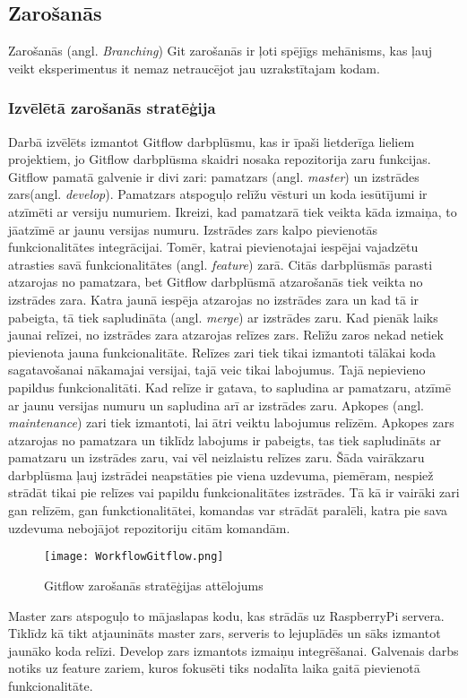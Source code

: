 \subsection{Zarošanās}
Zarošanās (angl. \textit{Branching})
Git zarošanās ir ļoti spējīgs mehānisms, kas ļauj veikt eksperimentus it nemaz netraucējot jau uzrakstītajam kodam.
\subsubsection{Izvēlētā zarošanās stratēģija}
Darbā izvēlēts izmantot Gitflow darbplūsmu, kas ir īpaši lietderīga lieliem projektiem, jo Gitflow darbplūsma skaidri nosaka repozitorija zaru funkcijas. Gitflow pamatā galvenie ir divi zari: pamatzars (angl. \textit{master}) un izstrādes zars(angl. \textit{develop}). Pamatzars atspoguļo relīžu vēsturi un koda iesūtījumi ir atzīmēti ar versiju numuriem. Ikreizi, kad pamatzarā tiek veikta kāda izmaiņa, to jāatzīmē ar jaunu versijas numuru. Izstrādes zars kalpo pievienotās funkcionalitātes integrācijai. Tomēr, katrai pievienotajai iespējai vajadzētu atrasties savā funkcionalitātes (angl. \textit{feature}) zarā. Citās darbplūsmās parasti atzarojas no pamatzara, bet Gitflow darbplūsmā atzarošanās tiek veikta no izstrādes zara. Katra jaunā iespēja atzarojas no izstrādes zara un kad tā ir pabeigta, tā tiek sapludināta (angl. \textit{merge}) ar izstrādes zaru.
Kad pienāk laiks jaunai relīzei, no izstrādes zara atzarojas relīzes zars. Relīžu zaros nekad netiek pievienota jauna funkcionalitāte. Relīzes zari tiek tikai izmantoti tālākai koda sagatavošanai nākamajai versijai, tajā veic tikai labojumus. Tajā nepievieno papildus funkcionalitāti. Kad relīze ir gatava, to sapludina ar pamatzaru, atzīmē ar jaunu versijas numuru un sapludina arī ar izstrādes zaru.
Apkopes (angl. \textit{maintenance}) zari tiek izmantoti, lai ātri veiktu labojumus relīzēm. Apkopes zars atzarojas no pamatzara un tiklīdz labojums ir pabeigts, tas tiek sapludināts ar pamatzaru un izstrādes zaru, vai vēl neizlaistu relīzes zaru.
Šāda vairākzaru darbplūsma ļauj izstrādei neapstāties pie viena uzdevuma, piemēram, nespiež strādāt tikai pie relīzes vai papildu funkcionalitātes izstrādes. Tā kā ir vairāki zari gan relīzēm, gan funkctionalitātei, komandas var strādāt paralēli, katra pie sava uzdevuma nebojājot repozitoriju citām komandām.
\begin{figure}[H]%
	\centering
	\captionsetup{justification=centering}
	\texttt{[image: WorkflowGitflow.png]}
	\caption{Gitflow zarošanās stratēģijas attēlojums}
	\label{fig:WorkflowGitflow}
\end{figure}
Master zars atspoguļo to mājaslapas kodu, kas strādās uz RaspberryPi servera. Tiklīdz kā tikt atjaunināts master zars, serveris to lejuplādēs un sāks izmantot jaunāko koda relīzi.
Develop zars izmantots izmaiņu integrēšanai.
Galvenais darbs notiks uz feature zariem, kuros fokusēti tiks nodalīta laika gaitā pievienotā funkcionalitāte.



